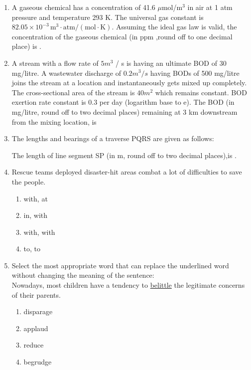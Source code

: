 \documentclass[journal,12pt,onecolumn]{IEEEtran}
\theoremstyle{remark}
\begin{document}
\begin{enumerate}
    \item A gaseous chemical has a concentration of 41.6 $\mu$mol/m$^3$ in air at 1 atm pressure and temperature 293 K. The universal gas constant is $82.05 \times 10^{-3} \, \text{m}^3 \cdot \text{atm} / (\text{mol} \cdot \text{K})$. Assuming the ideal gas law is valid, the concentration of the gaseous chemical (in ppm ,round off to one decimal place) is {\underline{\hspace{2cm}}}.

    \item A stream with a flow rate of $5m ^ 3$ / s is having an ultimate BOD of 30 mg/litre. A wastewater discharge of $0.2m ^ 3 / s$ having BODs of 500 mg/litre joins the stream at a location and instantaneously gets mixed up completely. The cross-sectional area of the stream is $40m ^ 2$ which remains constant. BOD exertion rate constant is 0.3 per day (logarithm base to e). The BOD (in mg/litre, round off to two decimal places) remaining at 3 km downstream from the mixing location, is

    \item The lengths and bearings of a traverse PQRS are given as follows:
   \begin{table}[H]
        \centering
    \end{table}
    The length of line segment SP (in m, round off to two decimal places),is {\underline{\hspace{2cm}}}.

    \item Rescue teams deployed {\underline{\hspace{2cm}}} disaster-hit areas combat {\underline{\hspace{2cm}}} a lot of difficulties to save the people. 
    \begin{enumerate}
        \item with, at
        \item in, with
        \item with, with
        \item to, to
    \end{enumerate}

    \item Select the most appropriate word that can replace the underlined word without changing the meaning of the sentence:\\Nowadays, most children have a tendency to \underline{belittle} the legitimate concerns of their parents.
    \begin{enumerate}
        \item disparage
        \item applaud
        \item reduce
        \item begrudge
    \end{enumerate}


\end{enumerate}
\end{document}
